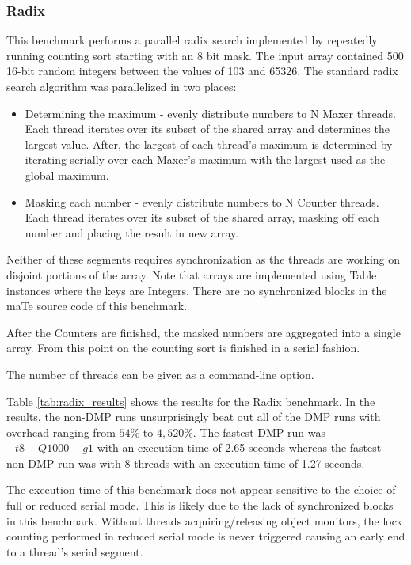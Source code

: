 \subsubsection{Radix}

This benchmark performs a parallel radix search implemented by
repeatedly running counting sort starting with an 8 bit mask.  The
input array contained 500 16-bit random integers between the values of
103 and 65326.  The standard radix search algorithm was parallelized
in two places:

\begin{itemize}
\item Determining the maximum - evenly distribute numbers to N Maxer
  threads.  Each thread iterates over its subset of the shared array
  and determines the largest value.  After, the largest of each
  thread's maximum is determined by iterating serially over each
  Maxer's maximum with the largest used as the global maximum.

\item Masking each number - evenly distribute numbers to N Counter
  threads.  Each thread iterates over its subset of the shared array,
  masking off each number and placing the result in new array.
\end{itemize}

Neither of these segments requires synchronization as the threads are
working on disjoint portions of the array.  Note that arrays are
implemented using Table instances where the keys are Integers.  There
are no synchronized blocks in the maTe source code of this benchmark.

After the Counters are finished, the masked numbers are aggregated
into a single array.  From this point on the counting sort is finished
in a serial fashion.

The number of threads can be given as a command-line option.

Table \ref{tab:radix_results} shows the results for the Radix
benchmark.  In the results, the non-DMP runs unsurprisingly beat out
all of the DMP runs with overhead ranging from $54\%$ to $4,520\%$.
The fastest DMP run was $-t8 -Q1000 -g1$ with an execution time of
2.65 seconds whereas the fastest non-DMP run was with 8 threads with
an execution time of 1.27 seconds.

The execution time of this benchmark does not appear sensitive to the
choice of full or reduced serial mode.  This is likely due to the lack
of synchronized blocks in this benchmark.  Without threads
acquiring/releasing object monitors, the lock counting performed in
reduced serial mode is never triggered causing an early end to a
thread's serial segment.

